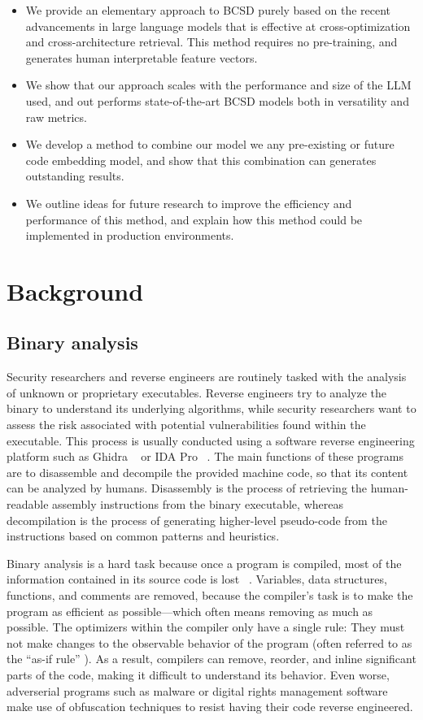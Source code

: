 \begin{itemize}
\item We provide an elementary approach to BCSD purely based on the recent advancements in large language models that
    is effective at cross-optimization and cross-architecture retrieval. This method requires no pre-training, and
    generates human interpretable feature vectors.
\item We show that our approach scales with the performance and size of the LLM used, and out performs state-of-the-art BCSD models
    both in versatility and raw metrics.
\item We develop a method to combine our model we any pre-existing or future code embedding model, and show that this combination can
    generates outstanding results.
\item We outline ideas for future research to improve the efficiency and performance of this method, and explain how this method
    could be implemented in production environments.
\end{itemize}

\section{Background}

\subsection{Binary analysis}

Security researchers and reverse engineers are routinely tasked with the analysis of unknown or proprietary executables.
Reverse engineers try to analyze the binary to understand its underlying algorithms, while security researchers want to assess
the risk associated with potential vulnerabilities found within the executable. This process is usually conducted using
a software reverse engineering platform such as Ghidra ~\cite{ghidra} or IDA Pro ~\cite{ida}. The main functions of these programs are to
disassemble and decompile the provided machine code, so that its content can be analyzed by humans. Disassembly is
the process of retrieving the human-readable assembly instructions from the binary executable, whereas decompilation
is the process of generating higher-level pseudo-code from the instructions based on common patterns and heuristics.

Binary analysis is a hard task because once a program is compiled, most of the information contained in its source code
is lost ~\cite{BCSDsurvey}. Variables, data structures, functions, and comments are removed, because the compiler's task is to make
the program as efficient as possible---which often means removing as much as possible. The optimizers within the compiler
only have a single rule: They must not make changes to the observable behavior of the program (often referred
to as the ``as-if rule'' \cite{c++11}). As a result, compilers can remove, reorder, and inline significant parts of the code, making
it difficult to understand its behavior. Even worse, adverserial programs such as malware or digital rights management software
make use of obfuscation techniques to resist having their code reverse engineered.

